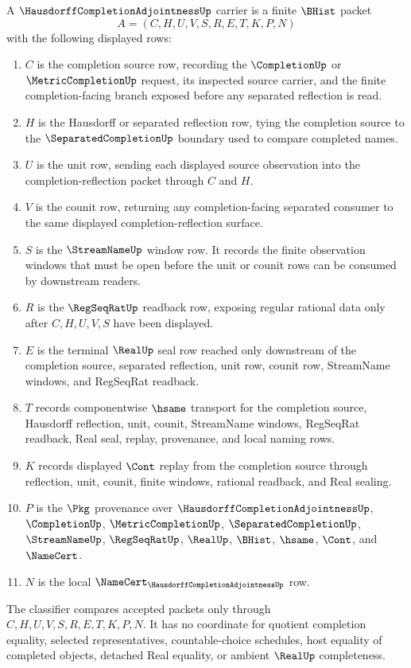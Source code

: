 \begin{definition}
\label{def:hausdorff-completion-adjointness-carrier}
A $\HausdorffCompletionAdjointnessUp$ carrier is a finite $\BHist$ packet
$$
A=(C,H,U,V,S,R,E,T,K,P,N)
$$
with the following displayed rows:
\begin{enumerate}
\item $C$ is the completion source row, recording the $\CompletionUp$ or $\MetricCompletionUp$ request, its inspected source carrier, and the finite completion-facing branch exposed before any separated reflection is read.
\item $H$ is the Hausdorff or separated reflection row, tying the completion source to the $\SeparatedCompletionUp$ boundary used to compare completed names.
\item $U$ is the unit row, sending each displayed source observation into the completion-reflection packet through $C$ and $H$.
\item $V$ is the counit row, returning any completion-facing separated consumer to the same displayed completion-reflection surface.
\item $S$ is the $\StreamNameUp$ window row. It records the finite observation windows that must be open before the unit or counit rows can be consumed by downstream readers.
\item $R$ is the $\RegSeqRatUp$ readback row, exposing regular rational data only after $C,H,U,V,S$ have been displayed.
\item $E$ is the terminal $\RealUp$ seal row reached only downstream of the completion source, separated reflection, unit row, counit row, StreamName windows, and RegSeqRat readback.
\item $T$ records componentwise $\hsame$ transport for the completion source, Hausdorff reflection, unit, counit, StreamName windows, RegSeqRat readback, Real seal, replay, provenance, and local naming rows.
\item $K$ records displayed $\Cont$ replay from the completion source through reflection, unit, counit, finite windows, rational readback, and Real sealing.
\item $P$ is the $\Pkg$ provenance over $\HausdorffCompletionAdjointnessUp$, $\CompletionUp$, $\MetricCompletionUp$, $\SeparatedCompletionUp$, $\StreamNameUp$, $\RegSeqRatUp$, $\RealUp$, $\BHist$, $\hsame$, $\Cont$, and $\NameCert$.
\item $N$ is the local $\NameCert_{\HausdorffCompletionAdjointnessUp}$ row.
\end{enumerate}
The classifier compares accepted packets only through $C,H,U,V,S,R,E,T,K,P,N$. It has no coordinate for quotient completion equality, selected representatives, countable-choice schedules, host equality of completed objects, detached Real equality, or ambient $\RealUp$ completeness.
\end{definition}

